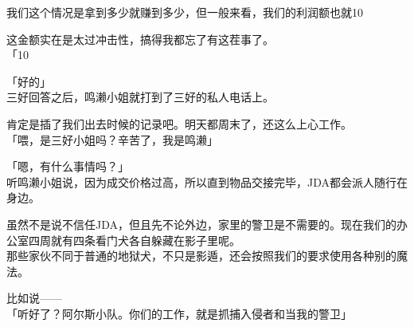 我们这个情况是拿到多少就赚到多少，但一般来看，我们的利润额也就10%

这金额实在是太过冲击性，搞得我都忘了有这茬事了。\\

「10%

「好的」\\

三好回答之后，鸣濑小姐就打到了三好的私人电话上。

肯定是插了我们出去时候的记录吧。明天都周末了，还这么上心工作。\\

「喂，是三好小姐吗？辛苦了，我是鸣濑」

「嗯，有什么事情吗？」\\

听鸣濑小姐说，因为成交价格过高，所以直到物品交接完毕，JDA都会派人随行在身边。

虽然不是说不信任JDA，但且先不论外边，家里的警卫是不需要的。现在我们的办公室四周就有四条看门犬各自躲藏在影子里呢。\\

那些家伙不同于普通的地狱犬，不只是影遁，还会按照我们的要求使用各种别的魔法。

比如说——\\

「听好了？阿尔斯小队。你们的工作，就是抓捕入侵者和当我的警卫」

